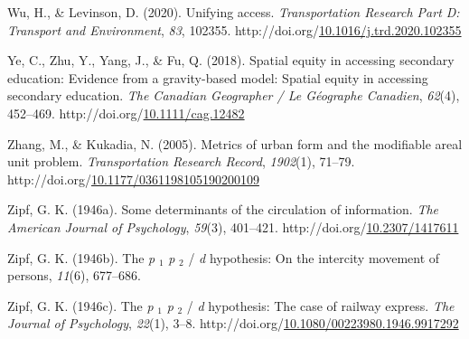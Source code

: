 \documentclass[
11pt, %
oneside, %
english, %
singlespacing, %
]{macthesis} %
\newlength{\cslhangindent}
\newenvironment{CSLReferences}[2] %
{\begin{list}{}{%
	\setlength{\itemindent}{0pt}
	\setlength{\leftmargin}{0pt}
	\setlength{\parsep}{0pt}
	\ifodd #1
	\setlength{\leftmargin}{\cslhangindent}
	\setlength{\itemindent}{-1\cslhangindent}
	\fi
	\setlength{\itemsep}{#2\baselineskip}}}
{\end{list}}
\begin{document}
\begin{CSLReferences}{1}{0}
Wu, H., \& Levinson, D. (2020). Unifying access. \emph{Transportation Research Part D: Transport and Environment}, \emph{83}, 102355. http://doi.org/\href{https://doi.org/10.1016/j.trd.2020.102355}{10.1016/j.trd.2020.102355}

Ye, C., Zhu, Y., Yang, J., \& Fu, Q. (2018). Spatial equity in accessing secondary education: {Evidence} from a gravity-based model: {Spatial} equity in accessing secondary education. \emph{The Canadian Geographer / Le Géographe Canadien}, \emph{62}(4), 452--469. http://doi.org/\href{https://doi.org/10.1111/cag.12482}{10.1111/cag.12482}

Zhang, M., \& Kukadia, N. (2005). Metrics of urban form and the modifiable areal unit problem. \emph{Transportation Research Record}, \emph{1902}(1), 71--79. http://doi.org/\href{https://doi.org/10.1177/0361198105190200109}{10.1177/0361198105190200109}

Zipf, G. K. (1946a). Some determinants of the circulation of information. \emph{The American Journal of Psychology}, \emph{59}(3), 401--421. http://doi.org/\href{https://doi.org/10.2307/1417611}{10.2307/1417611}

Zipf, G. K. (1946b). The \emph{p} \(_{\textrm{1}}\) \emph{p} \(_{\textrm{2}}\) / \emph{d} hypothesis: On the intercity movement of persons, \emph{11}(6), 677--686.

Zipf, G. K. (1946c). The \emph{p} \(_{\textrm{1}}\) \emph{p} \(_{\textrm{2}}\) / \emph{d} hypothesis: The case of railway express. \emph{The Journal of Psychology}, \emph{22}(1), 3--8. http://doi.org/\href{https://doi.org/10.1080/00223980.1946.9917292}{10.1080/00223980.1946.9917292}

\end{CSLReferences}
\end{document}
